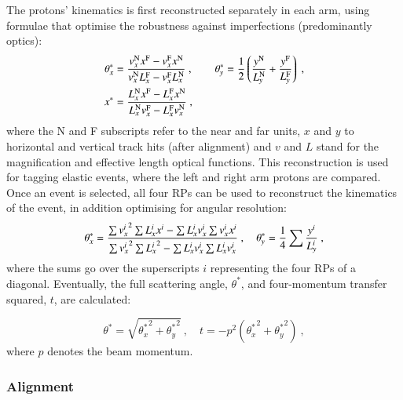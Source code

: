 The protons' kinematics is first reconstructed separately in each arm, using formulae that optimise the robustness against imperfections (predominantly optics):
\begin{equation}
\label{eq:kin 1a}
	\begin{aligned}
		\theta_x^* &= {v_x^{\rm N} x^{\rm F} - v_x^{\rm F} x^{\rm N}\over v_x^{\rm N} L_x^{\rm F} - v_x^{\rm F} L_x^{\rm N}}\ ,\qquad
		\theta_y^* = {1\over 2} \left( {y^{\rm N}\over L_y^{\rm N}} + {y^{\rm F}\over L_y^{\rm F}} \right)\ ,\\
		x^* &= {L_x^{\rm N} x^{\rm F} - L_x^{\rm F} x^{\rm N}\over L_x^{\rm N} v_x^{\rm F} - L_x^{\rm F} v_x^{\rm N}}\ , \\
	\end{aligned}
\end{equation}
where the N and F subscripts refer to the near and far units, $x$ and $y$ to horizontal and vertical track hits (after alignment) and $v$ and $L$ stand for the magnification and effective length optical functions. This reconstruction is used for tagging elastic events, where the left and right arm protons are compared. Once an event is selected, all four RPs can be used to reconstruct the kinematics of the event, in addition optimising for angular resolution:
\begin{equation}
\label{eq:kin 2a}
		\theta_x^* = {
				\sum {v_x^i}^2 \sum L_x^i x^i - \sum L_x^i v_x^i \sum v_x^i x^i
				\over
				\sum {v_x^i}^2 \sum {L_x^i}^2 - \sum L_x^i v_x^i \sum L_x^i v_x^i
			}\ ,\quad
		\theta_y^* = {1\over 4} \sum {y^i\over L_y^i}\ ,
\end{equation}
where the sums go over the superscripts $i$ representing the four RPs of a diagonal. Eventually, the full scattering angle, $\theta^*$, and four-momentum transfer squared, $t$, are calculated:

\begin{equation}
\label{eq:th t}
\theta^* = \sqrt{{\theta_x^*}^2 + {\theta_y^*}^2}\ ,\quad t = - p^2 ({\theta_x^*}^2 + {\theta_y^*}^2)\ ,
\end{equation}
where $p$ denotes the beam momentum.



\subsubsection{Alignment}
\label{sec:alignment}

